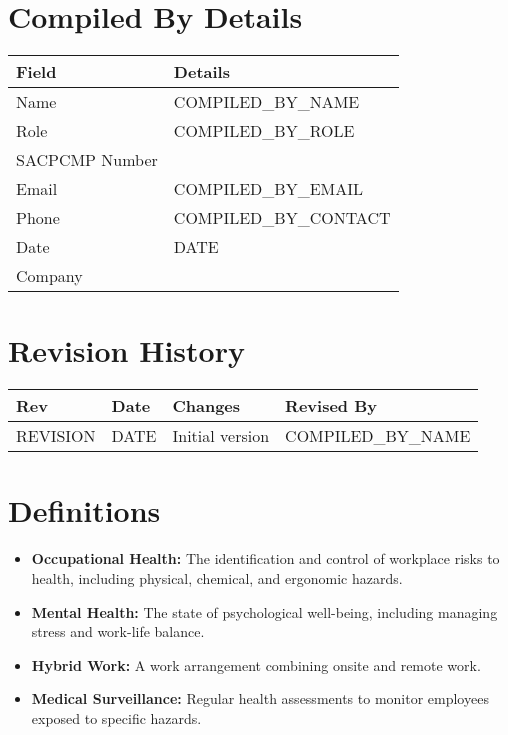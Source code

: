 \documentclass[11pt]{article}
\newcommand{\issueDate}{{{DATE}}}
\newcommand{\compilerName}{{{COMPILED_BY_NAME}}}
\newcommand{\compilerRole}{{{COMPILED_BY_ROLE}}}
\newcommand{\compilerSACPCMP}{}
\newcommand{\compilerEmail}{{{COMPILED_BY_EMAIL}}}
\newcommand{\compilerPhone}{{{COMPILED_BY_CONTACT}}}
\newcommand{\compilerCompany}{}
\newcommand{\revision}{{{REVISION}}}
\begin{document}
\section{Compiled By Details}
\begin{tabularx}{\textwidth}{lX}
  \toprule
  \textbf{Field} & \textbf{Details} \\
  \midrule
  Name & \compilerName \\
  Role & \compilerRole \\
  SACPCMP Number & \compilerSACPCMP \\
  Email & \compilerEmail \\
  Phone & \compilerPhone \\
  Date & \issueDate \\
  Company & \compilerCompany \\
  \bottomrule
\end{tabularx}

\section{Revision History}
\begin{tabularx}{\textwidth}{lXll}
  \toprule
  \textbf{Rev} & \textbf{Date} & \textbf{Changes} & \textbf{Revised By} \\
  \midrule
  \revision & \issueDate & Initial version & \compilerName \\
  \bottomrule
\end{tabularx}

\section{Definitions}
\begin{itemize}
    \item \textbf{Occupational Health:} The identification and control of workplace risks to health, including physical, chemical, and ergonomic hazards.
    \item \textbf{Mental Health:} The state of psychological well-being, including managing stress and work-life balance.
    \item \textbf{Hybrid Work:} A work arrangement combining onsite and remote work.
    \item \textbf{Medical Surveillance:} Regular health assessments to monitor employees exposed to specific hazards.
\end{itemize}
\end{document}
